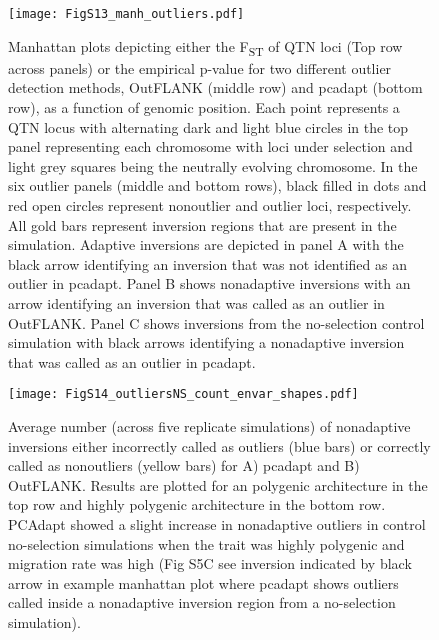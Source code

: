 \documentclass[10pt, scrartlc]{article}
\begin{document}
\clearpage
\newpage

\begin{figure}[h]
	\begin{center}
		\texttt{[image: FigS13\_manh\_outliers.pdf]}
	\end{center}
	\caption[Supplementary Figure 13: Incorrect Outlier Examples]{Manhattan plots depicting either the F\textsubscript{ST} of QTN loci (Top row across panels) or the empirical p-value for two different outlier detection methods, OutFLANK (middle row) and pcadapt (bottom row), as a function of genomic position. Each point represents a QTN locus with alternating dark and light blue circles in the top panel representing each chromosome with loci under selection and light grey squares being the neutrally evolving chromosome. In the six outlier panels (middle and bottom rows), black filled in dots and red open circles represent nonoutlier and outlier loci, respectively. All gold bars represent inversion regions that are present in the simulation. Adaptive inversions are depicted in panel A with the black arrow identifying an inversion that was not identified as an outlier in pcadapt. Panel B shows nonadaptive inversions with an arrow identifying an inversion that was called as an outlier in OutFLANK. Panel C shows inversions from the no-selection control simulation with black arrows identifying a nonadaptive inversion that was called as an outlier in pcadapt.}
\end{figure}

\clearpage
\newpage

\begin{figure}[h]
	\begin{center}
		\texttt{[image: FigS14\_outliersNS\_count\_envar\_shapes.pdf]}
	\end{center}
	\caption[Supplementary Figure 14: Genome Scan Performance for No-Selection Simulations]{Average number (across five replicate simulations) of nonadaptive inversions either incorrectly called as outliers (blue bars) or correctly called as nonoutliers (yellow bars) for A) pcadapt and B) OutFLANK. Results are plotted for an polygenic architecture in the top row and highly polygenic architecture in the bottom row. PCAdapt showed a slight increase in nonadaptive outliers in control no-selection simulations when the trait was highly polygenic and migration rate was high (Fig S5C see inversion indicated by black arrow in example manhattan plot where pcadapt shows outliers called inside a nonadaptive inversion region from a no-selection simulation).}
\end{figure}

\clearpage
\newpage
\end{document}
